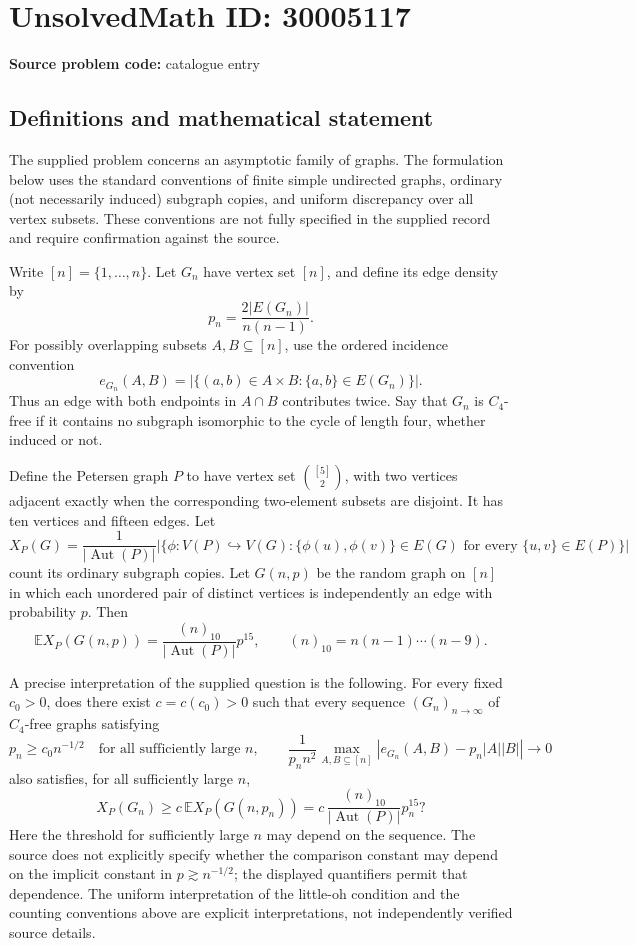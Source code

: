 \documentclass[11pt]{article}
\begin{document}
\section*{UnsolvedMath ID: 30005117}
\textbf{Source problem code:} catalogue entry
\subsection{Definitions and mathematical statement}
The supplied problem concerns an asymptotic family of graphs. The formulation below uses the standard conventions of finite simple undirected graphs, ordinary (not necessarily induced) subgraph copies, and uniform discrepancy over all vertex subsets. These conventions are not fully specified in the supplied record and require confirmation against the source.

Write \([n]=\{1,\ldots,n\}\). Let \(G_n\) have vertex set \([n]\), and define its edge density by
\[
p_n=\frac{2|E(G_n)|}{n(n-1)}.
\]
For possibly overlapping subsets \(A,B\subseteq[n]\), use the ordered incidence convention
\[
e_{G_n}(A,B)=\bigl|\{(a,b)\in A\times B:\{a,b\}\in E(G_n)\}\bigr|.
\]
Thus an edge with both endpoints in \(A\cap B\) contributes twice. Say that \(G_n\) is \(C_4\)-free if it contains no subgraph isomorphic to the cycle of length four, whether induced or not.

Define the Petersen graph \(P\) to have vertex set \(\binom{[5]}{2}\), with two vertices adjacent exactly when the corresponding two-element subsets are disjoint. It has ten vertices and fifteen edges. Let
\[
X_P(G)=\frac{1}{|\operatorname{Aut}(P)|}
\bigl|\{\phi:V(P)\hookrightarrow V(G):
\{\phi(u),\phi(v)\}\in E(G)\text{ for every }\{u,v\}\in E(P)\}\bigr|
\]
count its ordinary subgraph copies. Let \(G(n,p)\) be the random graph on \([n]\) in which each unordered pair of distinct vertices is independently an edge with probability \(p\). Then
\[
\mathbb E X_P(G(n,p))
=\frac{(n)_{10}}{|\operatorname{Aut}(P)|}p^{15},
\qquad (n)_{10}=n(n-1)\cdots(n-9).
\]

A precise interpretation of the supplied question is the following. For every fixed \(c_0>0\), does there exist \(c=c(c_0)>0\) such that every sequence \((G_n)_{n\to\infty}\) of \(C_4\)-free graphs satisfying
\[
p_n\ge c_0 n^{-1/2}
\quad\text{for all sufficiently large }n,
\qquad
\frac{1}{p_n n^2}
\max_{A,B\subseteq[n]}
\left|e_{G_n}(A,B)-p_n|A||B|\right|\longrightarrow0
\]
also satisfies, for all sufficiently large \(n\),
\[
X_P(G_n)\ge c\,\mathbb E X_P(G(n,p_n))
=c\,\frac{(n)_{10}}{|\operatorname{Aut}(P)|}p_n^{15}?
\]
Here the threshold for sufficiently large \(n\) may depend on the sequence. The source does not explicitly specify whether the comparison constant may depend on the implicit constant in \(p\gtrsim n^{-1/2}\); the displayed quantifiers permit that dependence. The uniform interpretation of the little-oh condition and the counting conventions above are explicit interpretations, not independently verified source details.
\end{document}
